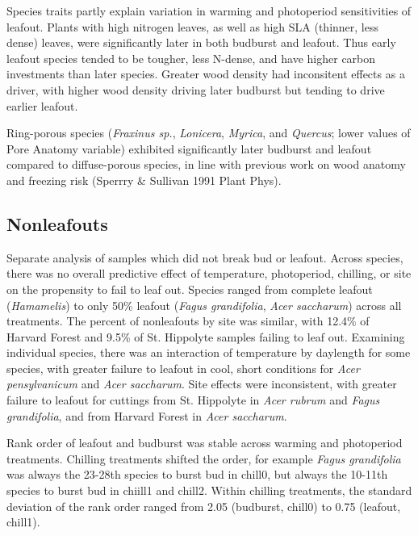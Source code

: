 \documentclass{article}
\begin{document}
Species traits partly explain variation in warming and photoperiod sensitivities of leafout. 
Plants with high nitrogen leaves, as well as high SLA (thinner, less dense) leaves, were significantly later in both budburst and leafout. Thus early leafout species tended to be tougher, less N-dense, and have higher carbon investments than later species. Greater wood density had inconsitent effects as a driver, with higher wood density driving later budburst but tending to drive earlier leafout.

Ring-porous species (\emph{Fraxinus sp.}, \emph{Lonicera}, \emph{Myrica}, and \emph{Quercus}; lower values of Pore Anatomy variable) exhibited significantly later budburst and leafout compared to diffuse-porous species, in line with previous work on wood anatomy and freezing risk (Sperrry \& Sullivan 1991 Plant Phys).

\subsection*{Nonleafouts}

Separate analysis of samples which did not break bud or leafout. Across species, there was no overall predictive effect of temperature, photoperiod, chilling, or site on the propensity to fail to leaf out. 
Species ranged from complete leafout (\emph{Hamamelis}) to only 50\% leafout (\emph{Fagus grandifolia}, \emph{Acer saccharum}) across all treatments. The percent of nonleafouts by site was similar, with 12.4\% of Harvard Forest and 9.5\% of St. Hippolyte samples failing to leaf out. Examining individual species,  there was an interaction of temperature by daylength for some species, with greater failure to leafout in cool, short conditions for \emph{Acer pensylvanicum}  and \emph{Acer saccharum}. Site effects were inconsistent, with greater failure to leafout for cuttings from St. Hippolyte in \emph{Acer rubrum} and \emph{Fagus grandifolia}, and from Harvard Forest in \emph{Acer saccharum}.


Rank order of leafout and budburst was stable across warming and photoperiod treatments. Chilling treatments shifted the order, for example \emph{Fagus grandifolia} was always the 23-28th species to burst bud in chill0, but always the 10-11th species to burst bud in chiill1 and chill2. Within chilling treatments, the standard deviation of the rank order ranged from 2.05 (budburst, chill0) to 0.75 (leafout, chill1). 
\end{document}
